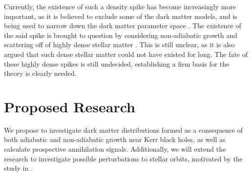 \documentclass[12pt]{article}
\begin{document}

Currently, the existence of such a density spike has become 
increasingly more important, as it  
is believed to exclude some of the dark matter models, and is 
being used to narrow down the dark matter parameter space \citep{gondolo2000dmsearch,bertone2001dmsearch,fields2014galactic}. 
The existence of the said spike is brought to question by 
considering non-adiabatic growth and scattering off of highly dense 
stellar matter \citep{ullio2001spike_criticism, merritt2002merger_criticism}. 
This is still unclear, as it is also 
argued that such dense stellar matter could not have existed 
for long. %
The 
fate of these highly dense spikes is still undecided, establishing a firm basis for the 
theory is clearly needed.

\section{Proposed Research}


We propose to investigate dark matter distributions formed 
as a consequence of both adiabatic and non-adiabatic growth near Kerr black holes, 
as well as calculate prospective annihilation signals. 
Additionally, we will extend the research to investigate possible perturbations to 
stellar orbits, motivated by the study in \citep{Sadeghian_Ferrer_Will_2013}. 

\end{document}
